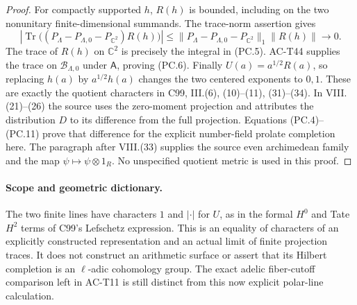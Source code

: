 \begin{proof}
For compactly supported $h$, $R(h)$ is bounded, including
on the two nonunitary finite-dimensional summands.
The trace-norm assertion gives
\[
 \left|\operatorname{Tr}\bigl(
 (P_\Lambda-P_{\Lambda,0}-P_{\mathbb C^2})R(h)\bigr)\right|
 \leq\|P_\Lambda-P_{\Lambda,0}-P_{\mathbb C^2}\|_1\|R(h)\|
 \longrightarrow0.
 \tag{PC.11}
\]
The trace of $R(h)$ on $\mathbb C^2$ is precisely the
integral in (PC.5).  AC-T44 supplies the trace on
$\mathcal B_{\Lambda,0}$ under $\mathsf A$, proving (PC.6).
Finally $U(a)=a^{1/2}R(a)$, so replacing $h(a)$ by
$a^{1/2}h(a)$ changes the two centered exponents to $0,1$.
These are exactly the quotient characters in C99,
III.(6), (10)--(11), (31)--(34).  In VIII.(21)--(26)
the source uses the zero-moment projection and attributes
the distribution $D$ to its difference from the full
projection.  Equations (PC.4)--(PC.11) prove that difference
for the explicit number-field prolate completion here.
The paragraph after VIII.(33) supplies the source even
archimedean family and the map $\psi\mapsto\psi\otimes1_R$.
No unspecified quotient metric is used in this proof.
\end{proof}

\paragraph{Scope and geometric dictionary.}
The two finite lines have characters $1$ and $|\cdot|$ for
$U$, as in the formal $H^0$ and Tate $H^2$ terms of C99's
Lefschetz expression.  This is an equality of characters
of an explicitly constructed representation and an actual
limit of finite projection traces.  It does not construct
an arithmetic surface or assert that its Hilbert completion
is an $\ell$-adic cohomology group.  The exact adelic
fiber-cutoff comparison left in AC-T11 is still distinct
from this now explicit polar-line calculation.
